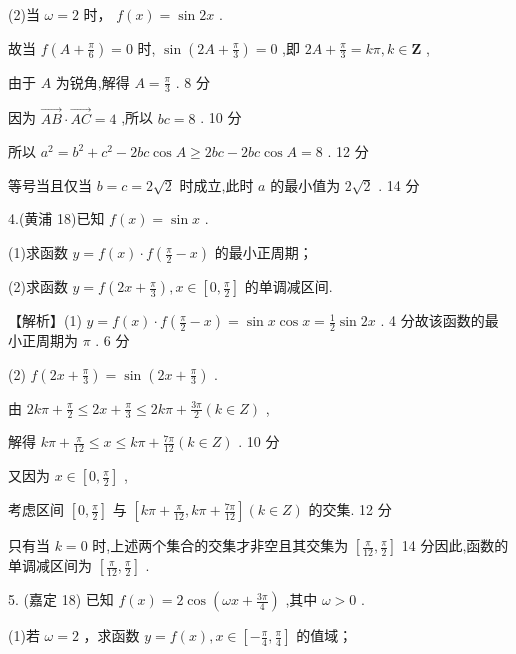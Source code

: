 \documentclass[10pt]{article}
\begin{document}
(2)当 \(\omega  = 2\) 时， \(f\left( x\right)  = \sin {2x}\) .

故当 \(f\left( {A + \frac{\pi }{6}}\right)  = 0\) 时, \(\sin \left( {{2A} + \frac{\pi }{3}}\right)  = 0\) ,即 \({2A} + \frac{\pi }{3} = {k\pi },k \in  \mathbf{Z}\) ,

由于 \(A\) 为锐角,解得 \(A = \frac{\pi }{3}\) . 8 分

因为 \(\overrightarrow{AB} \cdot  \overrightarrow{AC} = 4\) ,所以 \({bc} = 8\) . 10 分

所以 \({a}^{2} = {b}^{2} + {c}^{2} - {2bc}\cos A \geq  {2bc} - {2bc}\cos A = 8\) . 12 分

等号当且仅当 \(b = c = 2\sqrt{2}\) 时成立,此时 \(a\) 的最小值为 \(2\sqrt{2}\) . 14 分

4.(黄浦 18)已知 \(f\left( x\right)  = \sin x\) .

(1)求函数 \(y = f\left( x\right)  \cdot  f\left( {\frac{\pi }{2} - x}\right)\) 的最小正周期；

(2)求函数 \(y = f\left( {{2x} + \frac{\pi }{3}}\right) ,x \in  \left\lbrack  {0,\frac{\pi }{2}}\right\rbrack\) 的单调减区间.

【解析】(1) \(y = f\left( x\right)  \cdot  f\left( {\frac{\pi }{2} - x}\right)  = \sin x\cos x = \frac{1}{2}\sin {2x}\) . 4 分故该函数的最小正周期为 \(\pi\) . 6 分

(2) \(f\left( {{2x} + \frac{\pi }{3}}\right)  = \sin \left( {{2x} + \frac{\pi }{3}}\right)\) .

由 \({2k\pi } + \frac{\pi }{2} \leq  {2x} + \frac{\pi }{3} \leq  {2k\pi } + \frac{3\pi }{2}\left( {k \in  Z}\right)\) ,

解得 \({k\pi } + \frac{\pi }{12} \leq  x \leq  {k\pi } + \frac{7\pi }{12}\left( {k \in  Z}\right)\) . 10 分

又因为 \(x \in  \left\lbrack  {0,\frac{\pi }{2}}\right\rbrack\) ,

考虑区间 \(\left\lbrack  {0,\frac{\pi }{2}}\right\rbrack\) 与 \(\left\lbrack  {{k\pi } + \frac{\pi }{12},{k\pi } + \frac{7\pi }{12}}\right\rbrack  \left( {k \in  Z}\right)\) 的交集. 12 分

只有当 \(k = 0\) 时,上述两个集合的交集才非空且其交集为 \(\left\lbrack  {\frac{\pi }{12},\frac{\pi }{2}}\right\rbrack\) 14 分因此,函数的单调减区间为 \(\left\lbrack  {\frac{\pi }{12},\frac{\pi }{2}}\right\rbrack\) .

5. (嘉定 18) 已知 \(f\left( x\right)  = 2\cos \left( {{\omega x} + \frac{3\pi }{4}}\right)\) ,其中 \(\omega  > 0\) .

(1)若 \(\omega  = 2\) ，求函数 \(y = f\left( x\right) ,x \in  \left\lbrack  {-\frac{\pi }{4},\frac{\pi }{4}}\right\rbrack\) 的值域；
\end{document}
